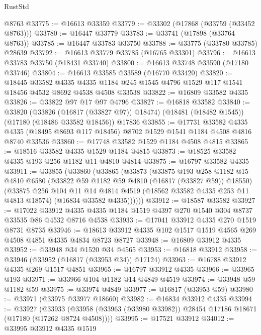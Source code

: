 \begin{lexlean}{RustStd}
\begin{coremodule}
{\begin{coremodule}
{{{{{{{{{{{{{{{{{{{{{{{{{{{{{{{{{{{{{{{{{{{{{{{{{{{{{{{    @8763
@33775 := @16613 @33359
@33779 := @33302 (@17868 (@33759 (@33452 @8763)))
@33780 := @16447 @33779
@33783 := @33741 (@17898 (@33764 @8763))
@33785 := @16447 @33783 @33750
@33788 := @33775 (@33780 @33785) @28639
@33792 := @16613 @33779 @33785 (@16765 @33301)
@33796 := @16613 @33783 @33750 (@18431 @33740)
@33800 := @16613 @33748 @33590 (@17180 @33746)
@33804 := @16613 @33585 @33589 (@16770 @33420)
@33820 := @18445
    @33582
    @4335
    @4335
    @1184
    @245
    @1545
    @4796
    @1529
    @117
    @1541
    @18456
    @4532
    @8692
    @4538
    @4508
    @33538
@33822 := @16809 @33582 @4335
@33826 := @33822 @97 @17 @97 @4796
@33827 := @16818 @33582
@33840 := @33820
    (@33826 (@16817 (@33827 @97)) @18474)
    (@18481 (@18482 @1545))
    (@17180 (@18486 @33582 @18456))
    @17836
@33855 := @17731
    @33582
    @4335
    @4335
    (@18495 @8693 @117 @18456)
    @8702
    @1529
    @1541
    @1184
    @4508
    @4816
    @8740
    @33536
@33860 := @17748 @33582 @1529 @1184 @4508 @4815
@33865 := @18516 @33582 @4335 @1529 @1184 @4815
@33873 := @18525 @33582 @4335 @193 @256 @1182 @11 @4810 @4814
@33875 := @16797 @33582 @4335
@33911 := @33855
    (@33860
      (@33865
        (@33873
          (@33875
            @193
            @258
            @1182
            @15
            @4810
            @6580
            (@33822 @59 @1182 @59 @4810 (@16817 (@33827 @59)) @18550)
            (@33875
              @256
              @104
              @11
              @14
              @4814
              @4519
              (@18562 @33582 @4335 @253 @11 @4813 @18574)
              (@16834 @33582 @4335))))))
@33912 := @18587 @33582
@33927 := @17022
    @33912
    @4335
    @4335
    @1184
    @1519
    @4397
    @270
    @1540
    @304
    @8737
    @33535
    @86
    @4532
    @8716
    @4538
@33933 := @17041 @33912 @4335 @270 @1519 @8731 @8735
@33946 := @18613 @33912 @4335 @102 @1517 @1519 @4565 @269 @4508 @4851 @4335 @4834 @8723 @8727
@33948 := @16809 @33912 @4335
@33952 := @33948 @34 @1520 @34 @4565
@33953 := @16818 @33912
@33958 := @33946 (@33952 (@16817 (@33953 @34)) @17124)
@33963 := @16788 @33912 @4335 @269 @1517 @4851
@33965 := @16797 @33912 @4335
@33966 := @33965 @193
@33971 := @33966 @104 @1182 @14 @4849 @4519
@33974 := @33948 @59 @1182 @59
@33975 := @33974 @4849
@33977 := @16817 (@33953 @59)
@33980 := @33971 (@33975 @33977 @18660)
@33982 := @16834 @33912 @4335
@33994 := @33927
    (@33933 (@33958 (@33963 (@33980 @33982)) @28454 @17186 @18671 (@17180 (@17262 @8724 @4508))))
@33995 := @17521 @33912
@34012 := @33995
    @33912
    @4335
    @1519
}}}}}}}}}}}}}}}}}}}}}}}}}}}}}}}}}}}}}}}}}}}}}}}}}}}}}}}
\end{coremodule}}
\end{coremodule}
\end{lexlean}
